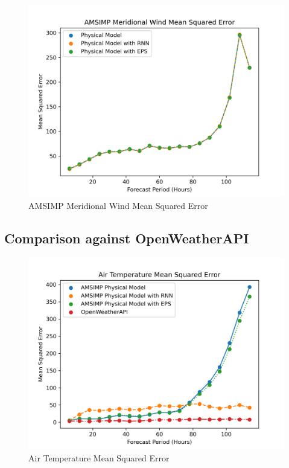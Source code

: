 \begin{figure}[H]
    \centering
    \includegraphics[width=.8\linewidth]{Graphs/accuracy/comparsion_schemes/meridional_wind.png}
    \caption{AMSIMP Meridional Wind Mean Squared Error}
\end{figure}

\subsection{Comparison against OpenWeatherAPI}
\begin{figure}[H]
    \centering
    \includegraphics[width=.8\linewidth]{Graphs/accuracy/comparsion_openweatherapi/temperature.png}
    \caption{Air Temperature Mean Squared Error}
\end{figure}

